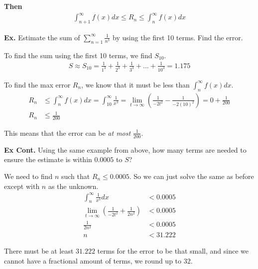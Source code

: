 \documentclass[12pt,letterpaper]{article} \usepackage{amsmath} \usepackage{graphicx}  \usepackage{longtable}  \usepackage{amssymb}
\begin{document}
        \textbf{Then} 
        \begin{align*}
            \int_{n+1}^{\infty}f(x)dx\le R_n \le \int^{\infty}_{n}f(x)dx    
        \end{align*}

        \begin{mdframed}
            \textbf{Ex.} Estimate the sum of $\sum^{\infty}_{n=1} \frac{1}{n^3}$ by using the first 10 terms. Find the error. 
            
            To find the sum using the first 10 terms, we find $S_{10}$.
            \begin{align*}
                S \approx S_{10} = \frac{1}{1^3} + \frac{1}{2^3} + \frac{1}{3^3} + ... + \frac{1}{10^3} = 1.175
            \end{align*}

            To find the max error $R_n$, we know that it must be less than $\int^{\infty}_{n} f(x)dx$.
            \begin{align*}
                R_n &\le \int^{\infty}_{n} f(x)dx = \int^{\infty}_{10} \frac{1}{x^3}= \lim_{t\to\infty} \left(\frac{1}{-2t^2} - \frac{1}{-2(10)^2}\right)= 0+\frac{1}{200} \\
                R_n &\le \frac{1}{200} 
            \end{align*}

            This means that the error can be \emph{at most} $\frac{1}{200}$. 
        \end{mdframed}

        \begin{mdframed}
            \textbf{Ex Cont.} Using the same example from above, how many terms are needed to ensure the estimate is within $0.0005$ to $S$?

            We need to find $n$ such that $R_n \le 0.0005$. So we can just solve the same as before except with $n$ as the unknown. 
            \begin{align*}
                \int^{\infty}_{n} \frac{1}{x^3}dx &< 0.0005\\
                \lim_{t\to \infty} \left( \frac{1}{-2t^2} + \frac{1}{2n^2}\right) &< 0.0005\\
                \frac{1}{2n^2} &< 0.0005\\
                n&<31.222
            \end{align*}

            There must be at least $31.222$ terms for the error to be that small, and since we cannot have a fractional amount of terms, we round up to $32$. 
        \end{mdframed}
\end{document}
